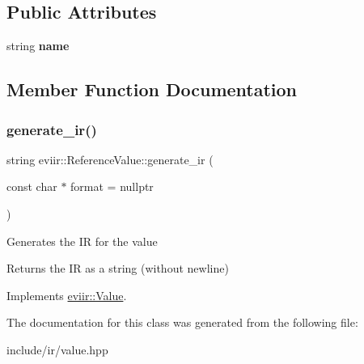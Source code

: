 \subsection*{Public Attributes}
\begin{DoxyCompactItemize}
\item 
\mbox{\label{classeviir_1_1ReferenceValue_a85868eceda63d8196653fee17207a16a}} 
string {\bfseries name}
\end{DoxyCompactItemize}


\subsection{Member Function Documentation}
\mbox{\label{classeviir_1_1ReferenceValue_a7b03ad70c7253d44fb7061a91751f9f6}} 
\subsubsection{\texorpdfstring{generate\+\_\+ir()}{generate\_ir()}}
{\footnotesize\ttfamily string eviir\+::\+Reference\+Value\+::generate\+\_\+ir (\begin{DoxyParamCaption}\item[{const char $\ast$}]{format = {\ttfamily nullptr} }\end{DoxyParamCaption})\hspace{0.3cm}{\ttfamily [virtual]}}

Generates the IR for the value \begin{DoxyReturn}{Returns}
the IR as a string (without newline) 
\end{DoxyReturn}


Implements \hyperlink{classeviir_1_1Value_a0613bf660425df31e230681555f64dea}{eviir\+::\+Value}.



The documentation for this class was generated from the following file\+:\begin{DoxyCompactItemize}
\item 
include/ir/value.\+hpp\end{DoxyCompactItemize}
